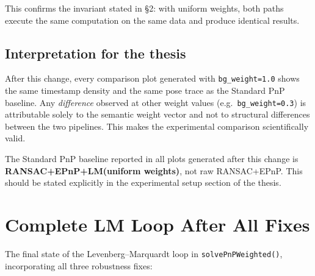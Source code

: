 \documentclass[12pt,a4paper]{article}
\begin{document}
This confirms the invariant stated in \S2: with uniform weights, both paths execute
the same computation on the same data and produce identical results.

\subsection{Interpretation for the thesis}

After this change, every comparison plot generated with
\texttt{bg\_weight=1.0} shows the same timestamp density and the same pose trace as
the Standard PnP baseline. Any \emph{difference} observed at other weight values
(e.g.\ \texttt{bg\_weight=0.3}) is attributable solely to the semantic weight vector
and not to structural differences between the two pipelines. This makes the
experimental comparison scientifically valid.

The Standard PnP baseline reported in all plots generated after this change is
\textbf{RANSAC+EPnP+LM(uniform weights)}, not raw RANSAC+EPnP. This should be
stated explicitly in the experimental setup section of the thesis.

\section{Complete LM Loop After All Fixes}

The final state of the Levenberg--Marquardt loop in \texttt{solvePnPWeighted()},
incorporating all three robustness fixes:
\end{document}
